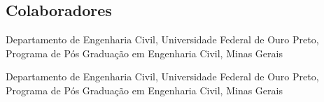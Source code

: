 \begin{frontmatter}
	\chapter*{Colaboradores}
\end{frontmatter}

\begin{contributorslist}
	\item {} Departamento de Engenharia Civil, Universidade Federal de Ouro Preto, Programa de Pós Graduação em Engenharia Civil, Minas Gerais

	\item {} Departamento de Engenharia Civil, Universidade Federal de Ouro Preto, Programa de Pós Graduação em Engenharia Civil, Minas Gerais
\end{contributorslist}